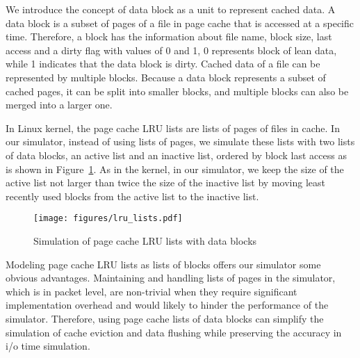 \documentclass[conference]{IEEEtran}
\begin{document}
			We introduce the concept of data block as a unit to represent cached data. 
			A data block is a subset of pages of a file in page cache that is accessed 
			at a specific time. Therefore, a block has the information about file name, 
			block size, last access and a dirty flag with values of 0 and 1, 
			0 represents block of lean data, while 1 indicates that the data block 
			is dirty. 
			Cached data of a file can be represented by multiple blocks. 
			Because a data block represents a subset of cached pages, 
			it can be split into smaller blocks, and multiple blocks can also 
			be merged into a larger one.
			
			In Linux kernel, the page cache LRU lists are lists of pages of 
			files in cache. In our simulator, instead of using lists of pages, 
			we simulate these lists with two lists of data blocks, an active list and 
			an inactive list, ordered by block last access as is shown in 
			Figure~\ref{fig:lrulist}.
			As in the kernel, in our simulator, we keep the size of the active list not 
			larger than twice the size of the inactive list by moving least recently 
			used blocks from the active list to the inactive list. 
			
			\begin{figure}
   				\centering
   				\texttt{[image: figures/lru\_lists.pdf]}
   				\caption{Simulation of page cache LRU lists with data blocks}\label{fig:lrulist}
			\end{figure}	
			
			Modeling page cache LRU lists as lists of blocks offers our simulator 
			some obvious advantages. 
			Maintaining and handling lists of pages in the simulator, which is in 
			packet level, are non-trivial when they require significant implementation 
			overhead and would likely to hinder the performance of the simulator. 
			Therefore, using page cache lists of data blocks can simplify the 
			simulation of cache eviction and data flushing while preserving
			the accuracy in i/o time simulation. 
			
\end{document}
